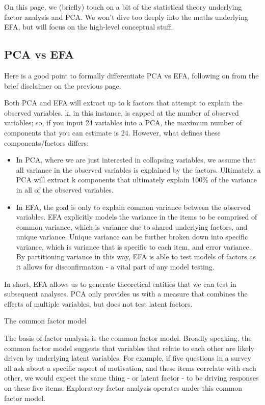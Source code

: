 \documentclass[
]{book}
\providecommand{\tightlist}{%
  \setlength{\itemsep}{0pt}\setlength{\parskip}{0pt}}
\begin{document}
On this page, we (briefly) touch on a bit of the statistical theory underlying factor analysis and PCA. We won't dive too deeply into the maths underlying EFA, but will focus on the high-level conceptual stuff.

\hypertarget{pca-vs-efa}{%
\subsection{PCA vs EFA}\label{pca-vs-efa}}

Here is a good point to formally differentiate PCA vs EFA, following on from the brief disclaimer on the previous page.

Both PCA and EFA will extract up to k factors that attempt to explain the observed variables. k, in this instance, is capped at the number of observed variables; so, if you input 24 variables into a PCA, the maximum number of components that you can estimate is 24. However, what defines these components/factors differs:

\begin{itemize}
\tightlist
\item
  In PCA, where we are just interested in collapsing variables, we assume that all variance in the observed variables is explained by the factors. Ultimately, a PCA will extract k components that ultimately explain 100\% of the variance in all of the observed variables.
\item
  In EFA, the goal is only to explain common variance between the observed variables. EFA explicitly models the variance in the items to be comprised of common variance, which is variance due to shared underlying factors, and unique variance. Unique variance can be further broken down into specific variance, which is variance that is specific to each item, and error variance. By partitioning variance in this way, EFA is able to test models of factors as it allows for disconfirmation - a vital part of any model testing.
\end{itemize}

In short, EFA allows us to generate theoretical entities that we can test in subsequent analyses. PCA only provides us with a measure that combines the effects of multiple variables, but does not test latent factors.

The common factor model

The basis of factor analysis is the common factor model. Broadly speaking, the common factor model suggests that variables that relate to each other are likely driven by underlying latent variables. For example, if five questions in a survey all ask about a specific aspect of motivation, and these items correlate with each other, we would expect the same thing - or latent factor - to be driving responses on these five items. Exploratory factor analysis operates under this common factor model.
\end{document}
